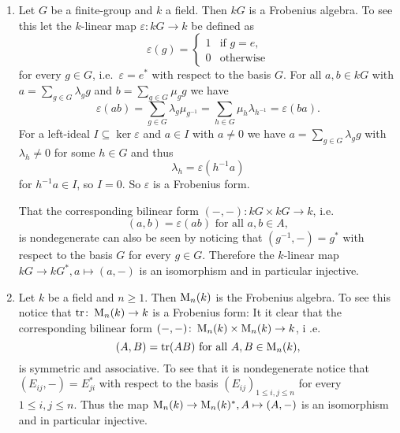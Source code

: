 \begin{expls}
 \begin{enumerate}[label=\emph{\alph*)}]
  \item
   Let $G$ be a finite-group and $k$ a field. Then $kG$ is a Frobenius algebra. To see this let the $k$-linear map $\varepsilon \colon kG \to k$ be defined as
   \[
    \varepsilon(g) =
    \begin{cases}
     1 & \text{if } g = e, \\
     0 & \text{otherwise}
    \end{cases}
   \]
   for every $g \in G$, i.e.\ $\varepsilon = e^*$ with respect to the basis $G$. For all $a,b \in kG$ with $a = \sum_{g \in G} \lambda_g g$ and $b = \sum_{g \in G} \mu_g g$ we have
   \[
    \varepsilon(ab)
    = \sum_{g \in G} \lambda_g \mu_{g^{-1}}
    = \sum_{h \in G} \mu_h \lambda_{h^{-1}}
    =  \varepsilon(ba).
   \]
   For a left-ideal $I \subseteq \ker \varepsilon$ and $a \in I $ with $a \neq 0$ we have $a = \sum_{g \in G} \lambda_g g$ with $\lambda_h \neq 0$ for some $h \in G$ and thus
   \[
    \lambda_h = \varepsilon\left( h^{-1} a \right)
   \]
   for $h^{-1} a \in I$, so $I = 0$. So $\varepsilon$ is a Frobenius form.
   
   That the corresponding bilinear form $(-,-) \colon kG \times kG \to k$, i.e.\
   \[
    (a,b) = \varepsilon(ab) \text{ for all } a,b \in A,
   \]
   is nondegenerate can also be seen by noticing that $(g^{-1},-) = g^*$ with respect to the basis $G$ for every $g \in G$. Therefore the $k$-linear map $kG \to kG^*, a \mapsto (a,-)$ is an isomorphism and in particular injective.
  \item
   Let $k$ be a field and $n \geq 1$. Then $\operatorname{M}_n(k)$ is the Frobenius algebra. To see this notice that $\operatorname{tr} \colon \operatorname{M}_n(k) \to k$ is a Frobenius form: It it clear that the corresponding bilinear form $(-,-) \colon \operatorname{M}_n(k) \times \operatorname{M}_n(k) \to k$, i .e.\
   \[
    (A,B) = \operatorname{tr}(AB) \text{ for all } A,B \in \operatorname{M}_n(k),
   \]
   is symmetric and associative. To see that it is nondegenerate notice that $(E_{ij}, -) = E_{ji}^*$ with respect to the basis $(E_{ij})_{1 \leq i,j \leq n}$ for every $1 \leq i,j \leq n$. Thus the map $\operatorname{M}_n(k) \to \operatorname{M}_n(k)^*, A \mapsto (A,-)$ is an isomorphism and in particular injective.
 \end{enumerate}
\end{expls}



